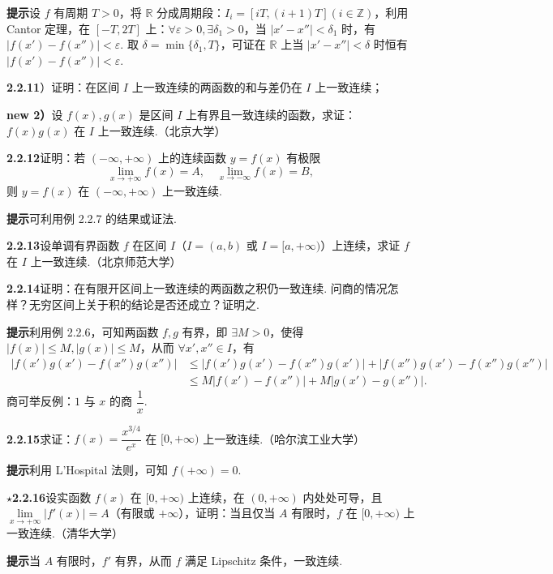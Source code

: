 \documentclass[UTF8, 12pt, fontset=fandol, oneside]{ctexart}
\begin{document}
\noindent\textbf{提示}\quad 设 $f$ 有周期 $T>0$，将 $\mathbb{R}$ 分成周期段：$I_i=[iT,(i+1)T](i\in\mathbb{Z})$，利用 Cantor 定理，在 $[-T,2T]$ 上：$\forall\varepsilon>0,\exists\delta_1>0$，当 $|x'-x''|<\delta_1$ 时，有 $|f(x')-f(x'')|<\varepsilon$. 取 $\delta=\min\{\delta_1,T\}$，可证在 $\mathbb{R}$ 上当 $|x'-x''|<\delta$ 时恒有 $|f(x')-f(x'')|<\varepsilon$.

\noindent\textbf{2.2.11}）证明：在区间 $I$ 上一致连续的两函数的和与差仍在 $I$ 上一致连续；

\noindent\textbf{new 2）}\quad 设 $f(x),g(x)$ 是区间 $I$ 上有界且一致连续的函数，求证：$f(x)g(x)$ 在 $I$ 上一致连续.（北京大学）

\noindent\textbf{2.2.12}\quad 证明：若 $(-\infty,+\infty)$ 上的连续函数 $y=f(x)$ 有极限
\[
  \lim_{x\to+\infty}f(x)=A,\quad \lim_{x\to-\infty}f(x)=B,
\]
则 $y=f(x)$ 在 $(-\infty,+\infty)$ 上一致连续.

\noindent\textbf{提示}\quad 可利用例 2.2.7 的结果或证法.

\noindent\textbf{2.2.13}\quad 设单调有界函数 $f$ 在区间 $I$（$I=(a,b)$ 或 $I=[a,+\infty)$）上连续，求证 $f$ 在 $I$ 上一致连续.（北京师范大学）

\noindent\textbf{2.2.14}\quad 证明：在有限开区间上一致连续的两函数之积仍一致连续. 问商的情况怎样？无穷区间上关于积的结论是否还成立？证明之.

\noindent\textbf{提示}\quad 利用例 2.2.6，可知两函数 $f,g$ 有界，即 $\exists M>0$，使得 $|f(x)|\le M,|g(x)|\le M$，从而 $\forall x',x''\in I$，有
\[
\begin{aligned}
|f(x')g(x')-f(x'')g(x'')|
&\le |f(x')g(x')-f(x'')g(x')|+|f(x'')g(x')-f(x'')g(x'')|\\
&\le M|f(x')-f(x'')|+M|g(x')-g(x'')|.
\end{aligned}
\]
商可举反例：$1$ 与 $x$ 的商 $\dfrac1x$.

\noindent\textbf{2.2.15}\quad 求证：$f(x)=\dfrac{x^{3/4}}{e^x}$ 在 $[0,+\infty)$ 上一致连续.（哈尔滨工业大学）

\noindent\textbf{提示}\quad 利用 L'Hospital 法则，可知 $f(+\infty)=0$.

\noindent\textbf{$\star$2.2.16}\quad 设实函数 $f(x)$ 在 $[0,+\infty)$ 上连续，在 $(0,+\infty)$ 内处处可导，且 $\lim\limits_{x\to+\infty}|f'(x)|=A$（有限或 $+\infty$），证明：当且仅当 $A$ 有限时，$f$ 在 $[0,+\infty)$ 上一致连续.（清华大学）

\noindent\textbf{提示}\quad 当 $A$ 有限时，$f'$ 有界，从而 $f$ 满足 Lipschitz 条件，一致连续.
\end{document}
